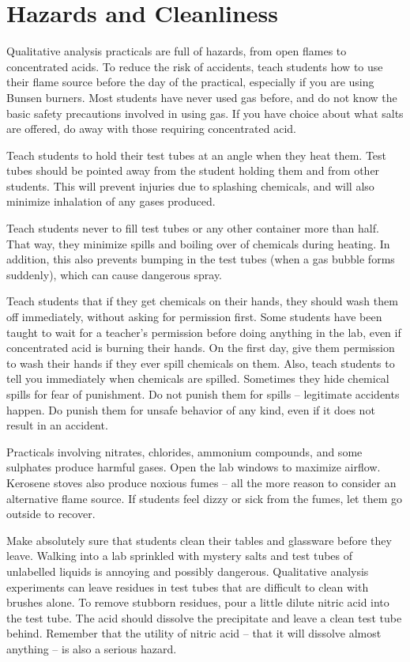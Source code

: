 \section{Hazards and Cleanliness}
Qualitative analysis practicals are full of hazards, 
from open flames to concentrated acids. 
To reduce the risk of accidents, 
teach students how to use their flame source 
before the day of the practical, 
especially if you are using Bunsen burners. 
Most students have never used gas before, 
and do not know the basic safety precautions involved in using gas. 
If you have choice about what salts are offered, 
do away with those requiring concentrated acid.

Teach students to hold their test tubes at an angle when they heat them. 
Test tubes should be pointed away from the student holding them 
and from other students. 
This will prevent injuries due to splashing chemicals, 
and will also minimize inhalation of any gases produced.

Teach students never to fill test tubes 
or any other container more than half. 
That way, 
they minimize spills and boiling over of chemicals during heating. 
In addition, 
this also prevents bumping in the test tubes 
(when a gas bubble forms suddenly), 
which can cause dangerous spray.

Teach students that if they get chemicals on their hands, 
they should wash them off immediately, 
without asking for permission first. 
Some students have been taught to wait for a teacher's permission 
before doing anything in the lab, 
even if concentrated acid is burning their hands. 
On the first day, 
give them permission to wash their hands 
if they ever spill chemicals on them. 
Also, 
teach students to tell you immediately when chemicals are spilled. 
Sometimes they hide chemical spills for fear of punishment. 
Do not punish them for spills -- legitimate accidents happen. 
Do punish them for unsafe behavior of any kind, 
even if it does not result in an accident. 

Practicals involving nitrates, 
chlorides, 
ammonium compounds, 
and some sulphates produce harmful gases. 
Open the lab windows to maximize airflow. 
Kerosene stoves also produce noxious fumes -- 
all the more reason to consider an alternative flame source. 
If students feel dizzy or sick from the fumes, 
let them go outside to recover.

Make absolutely sure that students clean their tables 
and glassware before they leave. 
Walking into a lab sprinkled with mystery salts 
and test tubes of unlabelled liquids is annoying and possibly dangerous. 
Qualitative analysis experiments can leave residues in test tubes 
that are difficult to clean with brushes alone. 
To remove stubborn residues, 
pour a little dilute nitric acid into the test tube. 
The acid should dissolve the precipitate 
and leave a clean test tube behind. 
Remember that the utility of nitric acid -- 
that it will dissolve almost anything -- is also a serious hazard.


